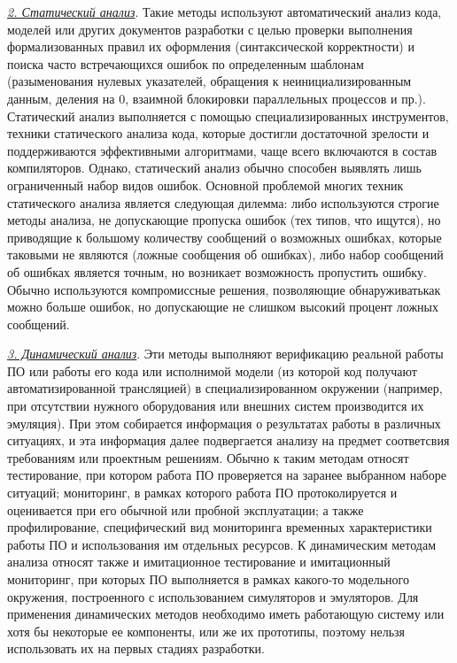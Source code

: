 \underline{\textit{2. Статический анализ}}. Такие методы используют автоматический анализ кода, моделей или других документов разработки с целью проверки выполнения формализованных правил их оформления (синтаксической корректности) и поиска часто встречающихся ошибок по определенным шаблонам (разыменования нулевых указателей, обращения к неинициализированным данным, деления на 0, взаимной блокировки параллельных процессов и пр.).
Статический анализ выполняется с помощью специализированных инструментов, техники статического анализа кода, которые достигли достаточной зрелости и поддерживаются эффективными алгоритмами, чаще всего включаются в состав компиляторов. Однако, статический анализ обычно способен выявлять лишь ограниченный набор видов ошибок.
Основной проблемой многих техник статического анализа является следующая дилемма: либо используются строгие методы анализа, не допускающие пропуска ошибок (тех типов, что ищутся), но приводящие к большому количеству сообщений о возможных ошибках, которые таковыми не являются (ложные сообщения об ошибках), либо набор сообщений об ошибках является точным, но возникает возможность пропустить ошибку. Обычно используются компромиссные решения, позволяющие обнаруживатькак можно больше ошибок, но допускающие не слишком высокий процент ложных сообщений.

\underline{\textit{3. Динамический анализ}}. Эти методы выполняют верификацию реальной работы ПО или работы его кода или исполнимой модели (из которой код получают автоматизированной трансляцией) в специализированном окружении (например, при отсутствии нужного оборудования или внешних систем производится их эмуляция). При этом собирается информация о результатах работы в различных ситуациях, и эта информация далее подвергается анализу на предмет соответсвия требованиям или проектным решениям. Обычно к таким методам относят тестирование, при котором работа ПО проверяется на заранее выбранном наборе ситуаций; мониторинг, в рамках которого работа ПО протоколируется и оценивается при его обычной или пробной эксплуатации; а также профилирование, специфический вид мониторинга временных характеристики работы ПО и использования им отдельных ресурсов. К динамическим методам анализа относят также и имитационное тестирование и имитационный мониторинг, при которых ПО выполняется в рамках какого-то модельного окружения, построенного с использованием симуляторов и эмуляторов. Для применения динамических методов необходимо иметь работающую систему или хотя бы некоторые ее компоненты, или же их прототипы, поэтому нельзя использовать их на первых стадиях разработки.

